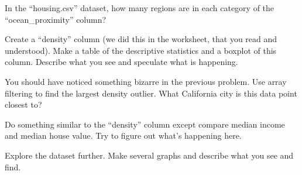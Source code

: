 \documentclass[11pt,letterpaper]{article}
\begin{document}
\begin{problem}
In the ``housing.csv'' dataset, how many regions are in each category of the ``ocean\_proximity'' 
column?
\end{problem}


\begin{problem}
Create a ``density'' column (we did this in the worksheet, that you read and understood). Make
a table of the descriptive statistics and a boxplot of this column. Describe what you see
and speculate what is happening. 
\end{problem}


\begin{problem}
 You should have noticed something bizarre in the previous problem. Use array filtering to find 
the largest density outlier. What California city is this data point closest to?
\end{problem}



\begin{problem}
 Do something similar to the ``density'' column except compare median income and median house value.
Try to figure out what's happening here.
\end{problem}



\begin{problem}
Explore the dataset further. Make several graphs and describe what you see and find.
\end{problem}
\end{document}
